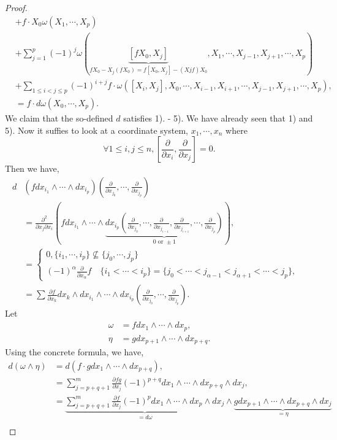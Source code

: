 \documentclass[10pt]{article}
\newcommand{\pd}[2]{{\frac {\partial #1} {\partial #2}}}
\begin{document}
\begin{proof}
\begin{align*}
    &+f\cdot X_0\omega(X_1,\cdots,X_p)\\
    & + \sum_{j=1}^p(-1)^j\omega(\underbrace{[fX_0,X_j]}_{fX_0-X_j(fX_0) = f[X_0,X_j]-(Xjf)X_0},X_1,\cdots,X_{j-1},X_{j+1},\cdots,X_p)\\
    & + \sum_{1\leq i< j\leq p}(-1)^{i+j}f\cdot\omega([X_i,X_j],X_0,\cdots,X_{i-1},X_{i+1},\cdots,X_{j-1},X_{j+1},\cdots,X_p),\\
    & = f\cdot d\omega(X_0,\cdots,X_p).
  \end{align*}
  We claim that the so-defined $d$ satisfies 1). - 5). We have already seen that 1) and 5). Now it suffies to look at a coordinate system, $x_1,\cdots,x_n$ where 
  \begin{equation*}
    \forall 1\leq i,j\leq n, \left[\pd{}{x_i},\pd{}{x_j}\right] = 0.
  \end{equation*}
  Then we have,
  \begin{align*}
    d&(fdx_{i_1}\wedge\cdots\wedge dx_{i_p})\left(\pd{}{x_{j_0}},\cdots,\pd{}{x_{j_p}}\right) &\\
    &= {\frac {\partial^2} {\partial x_j\partial x_i}}\left(fdx_{i_1}\wedge\cdots\wedge \underbrace{dx_{i_p}\left(\pd{}{x_{j_0}},\cdots,\pd{}{x_{j_{i-1}}},\pd{}{x_{j_{i+1}}},\cdots,\pd{}{x_{j_p}}\right)}_{0\text{ or }\pm 1}\right),\\
    & = \begin{cases}
      0, \{i_1,\cdots,i_p\}\not\subseteq\{j_0,\cdots,j_p\}\\
      (-1)^\alpha {\frac{\partial}{\partial x_{\alpha}}} f \quad \{i_1<\cdots<i_p\}=\{j_0<\cdots<j_{\alpha-1}<j_{\alpha+1}<\cdots<j_p\},
    \end{cases}
    \\
    & = \sum \pd{f}{x_k}dx_k\wedge dx_{i_1}\wedge\cdots\wedge dx_{i_p}\left(\pd{}{x_{j_0}},\cdots,\pd{}{x_{j_p}}\right).
  \end{align*}
  Let 
\begin{align*}
  \omega &= f dx_1\wedge\cdots\wedge dx_{p},\\
  \eta & = g dx_{p+1}\wedge\cdots\wedge dx_{p+q}.
\end{align*}
Using the concrete formula, we have,
\begin{align*}
  d(\omega\wedge\eta) & = d(f\cdot g dx_1\wedge\cdots\wedge dx_{p+q}),\\
  & = \sum_{j=p+q+1}^m \pd{fg}{x_j}(-1)^{p+q}dx_1\wedge\cdots\wedge dx_{p+q}\wedge dx_j,\\
  & = \underbrace{\sum_{j=p+q+1}^m \pd{f}{x_j}(-1)^p dx_1\wedge\cdots \wedge dx_p\wedge dx_j}_{=d\omega}\wedge \underbrace{gdx_{p+1}\wedge\cdots\wedge dx_{p+q}\wedge dx_j}_{=\eta}\\

\end{align*}
\end{proof}
\end{document}
